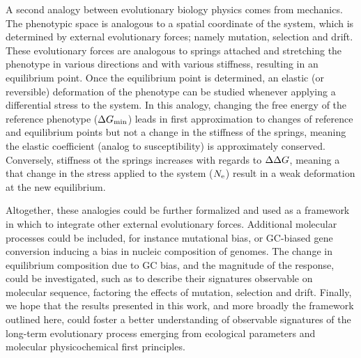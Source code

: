 A second analogy between evolutionary biology physics comes from mechanics.
The phenotypic space is analogous to a spatial coordinate of the system, which is determined by external evolutionary forces; namely mutation, selection and drift.
These evolutionary forces are analogous to springs attached and stretching the \gls{phenotype} in various directions and with various stiffness, resulting in an equilibrium point.
Once the equilibrium point is determined, an elastic (or reversible) deformation of the \gls{phenotype} can be studied whenever applying a differential stress to the system.
In this analogy, changing the free energy of the reference \gls{phenotype} ($\Delta G_{\text{min}}$) leads in first approximation to changes of reference and equilibrium points but not a change in the stiffness of the springs, meaning the elastic coefficient (analog to susceptibility) is approximately conserved.
Conversely, stiffness ot the springs increases with regards to $\Delta \Delta G$, meaning a that change in the stress applied to the system ($N_{\text{e}}$) result in a weak deformation at the new equilibrium.

Altogether, these analogies could be further formalized and used as a framework in which to integrate other external evolutionary forces.
Additional molecular processes could be included, for instance mutational bias, or \gls{GC-biased gene conversion} inducing a bias in nucleic composition of genomes.
The change in equilibrium composition due to GC bias, and the magnitude of the response, could be investigated, such as to describe their signatures observable on molecular sequence, factoring the effects of mutation, selection and drift.
Finally, we hope that the results presented in this work, and more broadly the framework outlined here, could foster a better understanding of observable signatures of the long-term evolutionary process emerging from ecological parameters and molecular physicochemical first principles.


